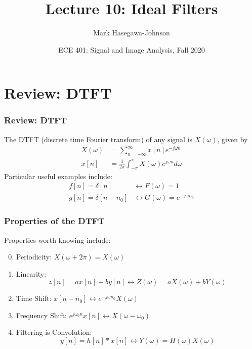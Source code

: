 \documentclass{beamer}
\title{Lecture 10: Ideal Filters}
\author{Mark Hasegawa-Johnson}
\date{ECE 401: Signal and Image Analysis, Fall 2020}
\begin{document}
\begin{frame}
  \maketitle
\end{frame}

\begin{frame}
  \tableofcontents
\end{frame}

\section[DTFT]{Review: DTFT}
\setcounter{subsection}{1}

\begin{frame}
  \frametitle{Review: DTFT}

  The DTFT (discrete time Fourier transform) of any signal is
  $X(\omega)$, given by
  \begin{align*}
    X(\omega) &= \sum_{n=-\infty}^\infty x[n]e^{-j\omega n}\\
    x[n] &= \frac{1}{2\pi}\int_{-\pi}^\pi X(\omega)e^{j\omega n}d\omega
  \end{align*}
  Particular useful examples include:
  \begin{align*}
    f[n]=\delta[n] &\leftrightarrow F(\omega)=1\\
    g[n]=\delta[n-n_0] &\leftrightarrow G(\omega)=e^{-j\omega n_0}
  \end{align*}
\end{frame}

\begin{frame}
  \frametitle{Properties of the DTFT}

  Properties worth knowing  include:
  \begin{enumerate}
    \setcounter{enumi}{-1}
  \item Periodicity: $X(\omega+2\pi)=X(\omega)$
  \item Linearity:
    \[z[n]=ax[n]+by[n]\leftrightarrow Z(\omega)=aX(\omega)+bY(\omega)
    \]
  \item Time Shift: $x[n-n_0]\leftrightarrow e^{-j\omega n_0}X(\omega)$
  \item Frequency Shift: $e^{j\omega_0 n}x[n]\leftrightarrow X(\omega-\omega_0)$
  \item Filtering is Convolution:
    \[
    y[n]=h[n]\ast x[n]\leftrightarrow Y(\omega)=H(\omega)X(\omega)
    \]
  \end{enumerate}
\end{frame}
\end{document}
